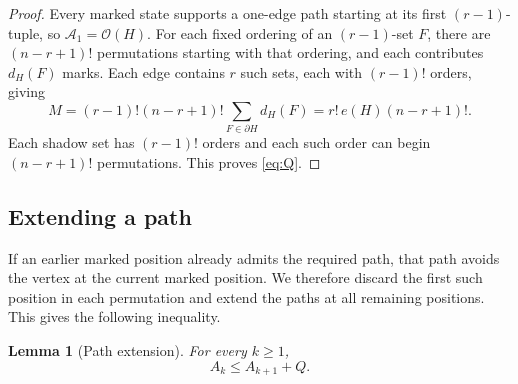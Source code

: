 \documentclass[11pt]{article}
\numberwithin{equation}{section}
\newtheorem{lemma}[theorem]{Lemma}
\theoremstyle{definition}
\newcommand{\cA}{\mathcal A}
\newcommand{\cO}{\mathcal O}
\begin{document}
\begin{proof}
Every marked state supports a one-edge path starting at its first
$(r-1)$-tuple, so $\cA_1=\cO(H)$.  For each fixed ordering of an
$(r-1)$-set $F$, there are $(n-r+1)!$ permutations starting with that
ordering, and each contributes $d_H(F)$ marks.  Each edge contains
$r$ such sets, each with $(r-1)!$ orders, giving
\[
 M=(r-1)!(n-r+1)!\sum_{F\in\partial H}d_H(F)
   =r!\,e(H)(n-r+1)!.
\]
Each shadow set has $(r-1)!$ orders and each such order can begin
$(n-r+1)!$ permutations.  This proves \eqref{eq:Q}.
\end{proof}

\subsection{Extending a path}

If an earlier marked position already admits the required path, that
path avoids the vertex at the current marked position.  We therefore
discard the first such position in each permutation and extend the
paths at all remaining positions.  This gives the following inequality.

\begin{lemma}[Path extension]
\label{lem:transfer}
For every $k\geq1$,
\begin{equation}
 A_k\leq A_{k+1}+Q.
 \label{eq:transfer}
\end{equation}
\end{lemma}
\end{document}
